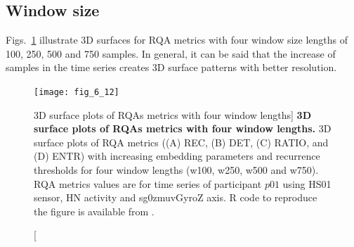 \subsection{Window size}
Figs.~\ref{fig:topo_windows} illustrate 3D surfaces for RQA metrics 
with four window size lengths of 100, 250, 500 and 750 samples.
In general, it can be said that the increase of samples in the time series 
creates 3D surface patterns with better resolution.
\begin{figure}
\centering
\texttt{[image: fig\_6\_12]}
    \caption
	[3D surface plots of RQAs metrics with four window lengths]{
	{\bf 3D surface plots of RQAs metrics with four window lengths.}
	3D surface plots of RQA metrics ((A) REC, (B) DET, (C) RATIO, and (D) ENTR) 
	with increasing embedding 
	parameters and recurrence thresholds for four window 
	lengths (w100, w250, w500 and  w750).
	RQA metrics values are for time series of participant $p01$ 
	using HS01 sensor, HN activity and sg0zmuvGyroZ axis.
	R code to reproduce the figure is available from \cite{xochicale2018}.
        }
\label{fig:topo_windows}
\end{figure}

\newpage
